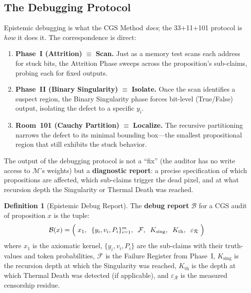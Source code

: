\documentclass[11pt,a4paper]{article}
\theoremstyle{definition}
\newtheorem{definition}{Definition}[section]
\theoremstyle{plain}
\theoremstyle{remark}
\begin{document}
\subsection{The Debugging Protocol}\label{subsec:debug-protocol}

Epistemic debugging is what the CGS Method \emph{does}; the 33+11+101 protocol is \emph{how} it does it. The correspondence is direct:

\begin{enumerate}[label=(\alph*), itemsep=6pt]
  \item \textbf{Phase~I (Attrition)} $\equiv$ \textbf{Scan.} Just as a memory test scans each address for stuck bits, the Attrition Phase sweeps across the proposition's sub-claims, probing each for fixed outputs.

  \item \textbf{Phase~II (Binary Singularity)} $\equiv$ \textbf{Isolate.} Once the scan identifies a suspect region, the Binary Singularity phase forces bit-level (True/False) output, isolating the defect to a specific $y_i$.

  \item \textbf{Room~101 (Cauchy Partition)} $\equiv$ \textbf{Localize.} The recursive partitioning narrows the defect to its minimal bounding box---the smallest propositional region that still exhibits the stuck behavior.
\end{enumerate}

The output of the debugging protocol is not a ``fix'' (the auditor has no write access to $\mathcal{M}$'s weights) but a \textbf{diagnostic report}: a precise specification of which propositions are affected, which sub-claims trigger the dead pixel, and at what recursion depth the Singularity or Thermal Death was reached.

\begin{definition}[Epistemic Debug Report]\label{def:debug-report}
The \textbf{debug report} $\mathcal{B}$ for a CGS audit of proposition $x$ is the tuple:
\begin{equation}\label{eq:debug-report}
  \mathcal{B}(x) = \Bigl(\; x_1,\;\; \{y_i, v_i, P_i\}_{i=1}^{m},\;\; \mathcal{F},\;\; K_{\mathrm{sing}},\;\; K_{\mathrm{th}},\;\; \varepsilon_{\mathcal{R}} \;\Bigr)
\end{equation}
where $x_1$ is the axiomatic kernel, $\{y_i, v_i, P_i\}$ are the sub-claims with their truth-values and token probabilities, $\mathcal{F}$ is the Failure Register from Phase~I, $K_{\mathrm{sing}}$ is the recursion depth at which the Singularity was reached, $K_{\mathrm{th}}$ is the depth at which Thermal Death was detected (if applicable), and $\varepsilon_{\mathcal{R}}$ is the measured censorship residue.
\end{definition}
\end{document}
